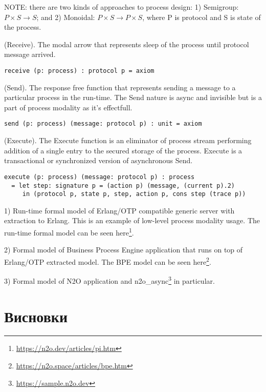 NOTE: there are two kinds of approaches to process design:
1) Semigroup: $P \times S \rightarrow S$;
and 2) Monoidal: $P \times S \rightarrow P \times S$,
where P is protocol and S is state of the process.

\begin{definition} (Receive).
The modal arrow that represents
sleep of the process until protocol message arrived.
\begin{lstlisting}
receive (p: process) : protocol p = axiom
\end{lstlisting}
\end{definition}

\begin{definition} (Send).
The response free function that represents
sending a message to a particular process in the run-time. The Send
nature is async and invisible but is a part of process modality as
it's effectfull.
\begin{lstlisting}
send (p: process) (message: protocol p) : unit = axiom
\end{lstlisting}
\end{definition}

\begin{definition} (Execute).
The Execute function is an
eliminator of process stream performing addition of a single entry
to the secured storage of the process. Execute is a transactional
or synchronized version of asynchronous Send.
\begin{lstlisting}
execute (p: process) (message: protocol p) : process
  = let step: signature p = (action p) (message, (current p).2)
     in (protocol p, state p, step, action p, cons step (trace p))
\end{lstlisting}
\end{definition}

1) Run-time formal model
of Erlang/OTP compatible generic server with extraction to Erlang.
This is an example of low-level process modality usage.
The run-time formal model can be seen
here\footnote{\url{https://n2o.dev/articles/pi.htm}}.

2) Formal model of Business Process Engine application that runs on top of Erlang/OTP
extracted model. The BPE model can be seen
here\footnote{\url{https://n2o.space/articles/bpe.htm}}.

3) Formal model of N2O application
and n2o\_async\footnote{\url{https://sample.n2o.dev}} in particular.

\section{Висновки}

